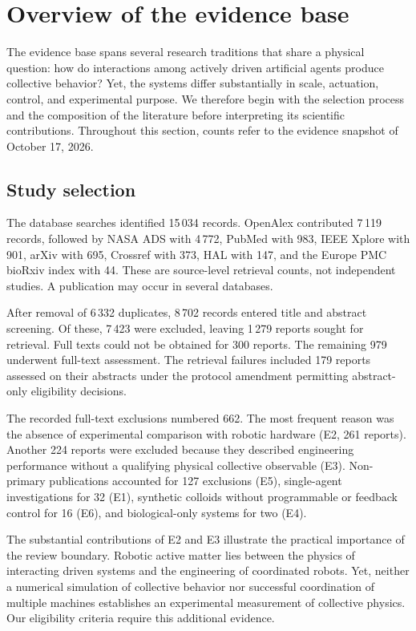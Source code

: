 \section{Overview of the evidence base}
\label{sec:results_overview}

The evidence base spans several research traditions that share a physical question: how do interactions among actively driven artificial agents produce collective behavior? Yet, the systems differ substantially in scale, actuation, control, and experimental purpose. We therefore begin with the selection process and the composition of the literature before interpreting its scientific contributions. Throughout this section, counts refer to the evidence snapshot of October 17, 2026.

\subsection{Study selection}
\label{sec:results-selection}

The database searches identified 15\,034 records. OpenAlex contributed 7\,119 records, followed by NASA ADS with 4\,772, PubMed with 983, IEEE Xplore with 901, arXiv with 695, Crossref with 373, HAL with 147, and the Europe PMC bioRxiv index with 44. These are source-level retrieval counts, not independent studies. A publication may occur in several databases.

After removal of 6\,332 duplicates, 8\,702 records entered title and abstract screening. Of these, 7\,423 were excluded, leaving 1\,279 reports sought for retrieval. Full texts could not be obtained for 300 reports. The remaining 979 underwent full-text assessment. The retrieval failures included 179 reports assessed on their abstracts under the protocol amendment permitting abstract-only eligibility decisions.

The recorded full-text exclusions numbered 662. The most frequent reason was the absence of experimental comparison with robotic hardware (E2, 261 reports). Another 224 reports were excluded because they described engineering performance without a qualifying physical collective observable (E3). Non-primary publications accounted for 127 exclusions (E5), single-agent investigations for 32 (E1), synthetic colloids without programmable or feedback control for 16 (E6), and biological-only systems for two (E4).

The substantial contributions of E2 and E3 illustrate the practical importance of the review boundary. Robotic active matter lies between the physics of interacting driven systems and the engineering of coordinated robots. Yet, neither a numerical simulation of collective behavior nor successful coordination of multiple machines establishes an experimental measurement of collective physics. Our eligibility criteria require this additional evidence.

